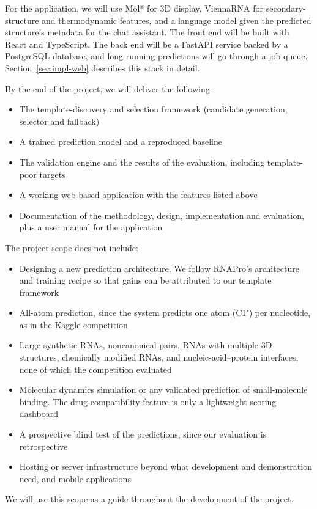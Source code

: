 \documentclass{FastFyp}
\begin{document}
For the application, we will use Mol* for 3D display, ViennaRNA for secondary-structure and thermodynamic features, and a language model given the predicted structure's metadata for the chat assistant. The front end will be built with React and TypeScript. The back end will be a FastAPI service backed by a PostgreSQL database, and long-running predictions will go through a job queue. Section~\ref{sec:impl-web} describes this stack in detail.

By the end of the project, we will deliver the following:
\begin{itemize}
\item The template-discovery and selection framework (candidate generation, selector and fallback)
\item A trained prediction model and a reproduced baseline
\item The validation engine and the results of the evaluation, including template-poor targets
\item A working web-based application with the features listed above
\item Documentation of the methodology, design, implementation and evaluation, plus a user manual for the application
\end{itemize}

The project scope does not include:
\begin{itemize}
\item Designing a new prediction architecture. We follow RNAPro's architecture and training recipe so that gains can be attributed to our template framework
\item All-atom prediction, since the system predicts one atom (C1$'$) per nucleotide, as in the Kaggle competition \cite{leerna}
\item Large synthetic RNAs, noncanonical pairs, RNAs with multiple 3D structures, chemically modified RNAs, and nucleic-acid--protein interfaces, none of which the competition evaluated \cite{leerna}
\item Molecular dynamics simulation or any validated prediction of small-molecule binding. The drug-compatibility feature is only a lightweight scoring dashboard
\item A prospective blind test of the predictions, since our evaluation is retrospective
\item Hosting or server infrastructure beyond what development and demonstration need, and mobile applications
\end{itemize}
We will use this scope as a guide throughout the development of the project.
\end{document}
